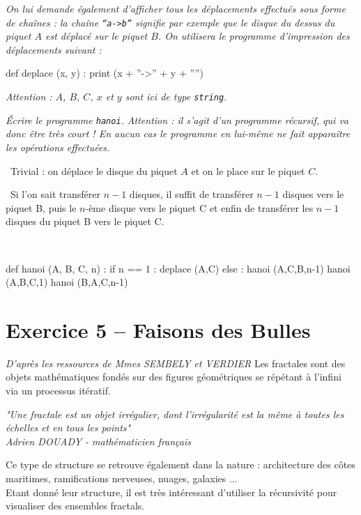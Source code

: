 \textit{On lui demande également d'afficher tous les déplacements effectués sous forme de chaînes : la chaîne 
\texttt{``a->b''} signifie par exemple que le disque du dessus du piquet $A$ est déplacé sur le piquet $B$. On 
utilisera le programme 
d'impression des déplacements suivant :\\}

\begin{python}
def deplace (x, y) :
    print (x + ''->'' + y + ''\n'')
\end{python}

\textit{Attention : $A$, $B$, $C$, $x$ et $y$ sont ici de type \texttt{string}.\\}

\textit{Écrire le programme \texttt{hanoi}. Attention : il s'agit d'un programme récursif, qui va donc être très court 
! En 
aucun cas le programme en lui-même ne fait apparaître les opérations effectuées.}

\ifprof
\begin{corrige}

\question\
Trivial : on déplace le disque du piquet $A$ et on le place sur le piquet $C$.

\question\
Si l'on sait transférer $n-1$ disques, il suffit de
transférer $n-1$ disques vers le piquet B, puis le $n$-ème disque vers le piquet C et enfin de transférer les $n-1$ 
disques du piquet B vers le piquet C.

\question\
\begin{python}
def hanoi (A, B, C, n) :
    if n == 1 :
	deplace (A,C)
    else :
	hanoi (A,C,B,n-1)
	hanoi (A,B,C,1)
	hanoi (B,A,C,n-1)
\end{python}

\setcounter{question}{0}
\end{corrige}
\else
\fi


\section*{Exercice 5 -- Faisons des Bulles}
\setcounter{exo}{0}

\ifprof
\else
\textit{ D'après les ressources de Mmes SEMBELY et VERDIER}
Les fractales sont des objets mathématiques fondés sur des figures géométriques se répétant à l'infini via un processus 
itératif.
\begin{center}
\textit{ "Une fractale est un objet irrégulier, dont l'irrégularité est la même à toutes les échelles et en tous les 
points"
\\
Adrien DOUADY - mathématicien français}
\end{center}
Ce type de structure se retrouve également dans la nature : architecture des côtes maritimes, ramifications nerveuses, 
nuages, galaxies ...
\\
Etant donné leur structure, il est très intéressant d'utiliser la récursivité pour visualiser des ensembles fractals.
\\

